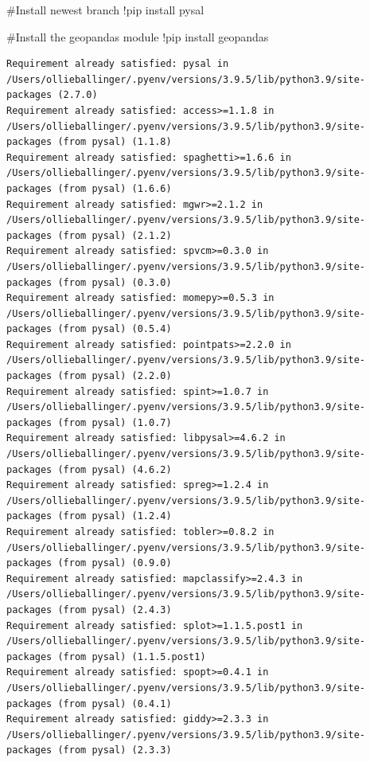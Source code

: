 \documentclass[
  letterpaper,
  DIV=11,
  numbers=noendperiod]{scrreprt}
\newenvironment{Shaded}{\begin{snugshade}}{\end{snugshade}}
\newcommand{\CommentTok}[1]{\textcolor[rgb]{0.37,0.37,0.37}{#1}}
\newcommand{\NormalTok}[1]{\textcolor[rgb]{0.00,0.23,0.31}{#1}}
\newcommand{\OperatorTok}[1]{\textcolor[rgb]{0.37,0.37,0.37}{#1}}
\begin{document}
\begin{Shaded}
\begin{Highlighting}[]
\CommentTok{\#Install newest branch}
\OperatorTok{!}\NormalTok{pip install pysal}

\CommentTok{\#Install the geopandas module}
\OperatorTok{!}\NormalTok{pip install geopandas}
\end{Highlighting}
\end{Shaded}

\begin{verbatim}
Requirement already satisfied: pysal in /Users/ollieballinger/.pyenv/versions/3.9.5/lib/python3.9/site-packages (2.7.0)
Requirement already satisfied: access>=1.1.8 in /Users/ollieballinger/.pyenv/versions/3.9.5/lib/python3.9/site-packages (from pysal) (1.1.8)
Requirement already satisfied: spaghetti>=1.6.6 in /Users/ollieballinger/.pyenv/versions/3.9.5/lib/python3.9/site-packages (from pysal) (1.6.6)
Requirement already satisfied: mgwr>=2.1.2 in /Users/ollieballinger/.pyenv/versions/3.9.5/lib/python3.9/site-packages (from pysal) (2.1.2)
Requirement already satisfied: spvcm>=0.3.0 in /Users/ollieballinger/.pyenv/versions/3.9.5/lib/python3.9/site-packages (from pysal) (0.3.0)
Requirement already satisfied: momepy>=0.5.3 in /Users/ollieballinger/.pyenv/versions/3.9.5/lib/python3.9/site-packages (from pysal) (0.5.4)
Requirement already satisfied: pointpats>=2.2.0 in /Users/ollieballinger/.pyenv/versions/3.9.5/lib/python3.9/site-packages (from pysal) (2.2.0)
Requirement already satisfied: spint>=1.0.7 in /Users/ollieballinger/.pyenv/versions/3.9.5/lib/python3.9/site-packages (from pysal) (1.0.7)
Requirement already satisfied: libpysal>=4.6.2 in /Users/ollieballinger/.pyenv/versions/3.9.5/lib/python3.9/site-packages (from pysal) (4.6.2)
Requirement already satisfied: spreg>=1.2.4 in /Users/ollieballinger/.pyenv/versions/3.9.5/lib/python3.9/site-packages (from pysal) (1.2.4)
Requirement already satisfied: tobler>=0.8.2 in /Users/ollieballinger/.pyenv/versions/3.9.5/lib/python3.9/site-packages (from pysal) (0.9.0)
Requirement already satisfied: mapclassify>=2.4.3 in /Users/ollieballinger/.pyenv/versions/3.9.5/lib/python3.9/site-packages (from pysal) (2.4.3)
Requirement already satisfied: splot>=1.1.5.post1 in /Users/ollieballinger/.pyenv/versions/3.9.5/lib/python3.9/site-packages (from pysal) (1.1.5.post1)
Requirement already satisfied: spopt>=0.4.1 in /Users/ollieballinger/.pyenv/versions/3.9.5/lib/python3.9/site-packages (from pysal) (0.4.1)
Requirement already satisfied: giddy>=2.3.3 in /Users/ollieballinger/.pyenv/versions/3.9.5/lib/python3.9/site-packages (from pysal) (2.3.3)

\end{verbatim}
\end{document}
